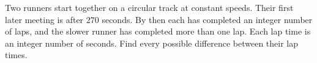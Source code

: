 Two runners start together on a circular track at constant speeds. Their first later meeting is after $270$ seconds. By then each has completed an integer number of laps, and the slower runner has completed more than one lap. Each lap time is an integer number of seconds. Find every possible difference between their lap times.
